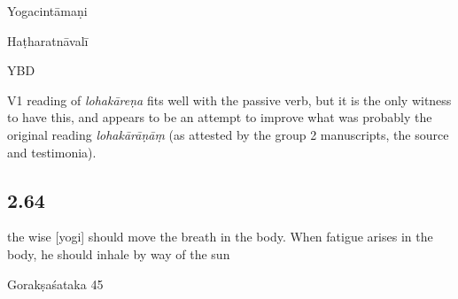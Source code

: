 \begin{ekdosis}
\begin{testimonia}[hp02_063]
Yogacintāmaṇi

\begin{versinnote}
\end{versinnote}

Haṭharatnāvalī

\begin{versinnote}
\end{versinnote}

YBD

\begin{versinnote}
\end{versinnote}
\end{testimonia}

\begin{philcomm}[hp02_063]
V1 reading of \emph{lohakāreṇa} fits well with the passive verb, but it is the only witness to have this, and appears to be an attempt to improve what was probably the original reading \emph{lohakārāṇāṃ} (as attested by the group 2 manuscripts, the source and testimonia).
\end{philcomm}

\subsection*{2.64}
\begin{translation}[hp02_064]
[...] the wise [yogi] should move the breath in the body. When fatigue arises in the body, he should inhale by way of the sun
\end{translation}

\begin{sources}[hp02_064]
Gorakṣaśataka 45

\begin{versinnote}
\end{versinnote}
\end{sources}


\end{ekdosis}
